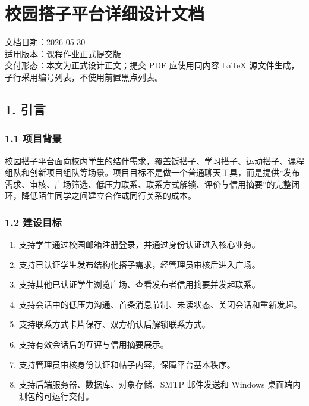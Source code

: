 \documentclass[
]{ctexart}
\author{}
\date{}
\providecommand{\tightlist}{%
  \setlength{\itemsep}{0pt}\setlength{\parskip}{0pt}}
\begin{document}
\hypertarget{ux6821ux56edux642dux5b50ux5e73ux53f0ux8be6ux7ec6ux8bbeux8ba1ux6587ux6863}{%
\section{校园搭子平台详细设计文档}\label{ux6821ux56edux642dux5b50ux5e73ux53f0ux8be6ux7ec6ux8bbeux8ba1ux6587ux6863}}

文档日期：2026-05-30\\
适用版本：课程作业正式提交版\\
交付形态：本文为正式设计正文；提交 PDF 应使用同内容 LaTeX
源文件生成，子行采用编号列表，不使用前置黑点列表。

\hypertarget{ux5f15ux8a00}{%
\subsection{1. 引言}\label{ux5f15ux8a00}}

\hypertarget{ux9879ux76eeux80ccux666f}{%
\subsubsection{1.1 项目背景}\label{ux9879ux76eeux80ccux666f}}

校园搭子平台面向校内学生的结伴需求，覆盖饭搭子、学习搭子、运动搭子、课程组队和创新项目组队等场景。项目目标不是做一个普通聊天工具，而是提供``发布需求、审核、广场筛选、低压力联系、联系方式解锁、评价与信用摘要''的完整闭环，降低陌生同学之间建立合作或同行关系的成本。

\hypertarget{ux5efaux8bbeux76eeux6807}{%
\subsubsection{1.2 建设目标}\label{ux5efaux8bbeux76eeux6807}}

\begin{enumerate}
\def\labelenumi{\arabic{enumi}.}
\tightlist
\item
  支持学生通过校园邮箱注册登录，并通过身份认证进入核心业务。
\item
  支持已认证学生发布结构化搭子需求，经管理员审核后进入广场。
\item
  支持其他已认证学生浏览广场、查看发布者信用摘要并发起联系。
\item
  支持会话中的低压力沟通、首条消息节制、未读状态、关闭会话和重新发起。
\item
  支持联系方式卡片保存、双方确认后解锁联系方式。
\item
  支持有效会话后的互评与信用摘要展示。
\item
  支持管理员审核身份认证和帖子内容，保障平台基本秩序。
\item
  支持后端服务器、数据库、对象存储、SMTP 邮件发送和 Windows
  桌面端内测包的可运行交付。
\end{enumerate}
\end{document}
